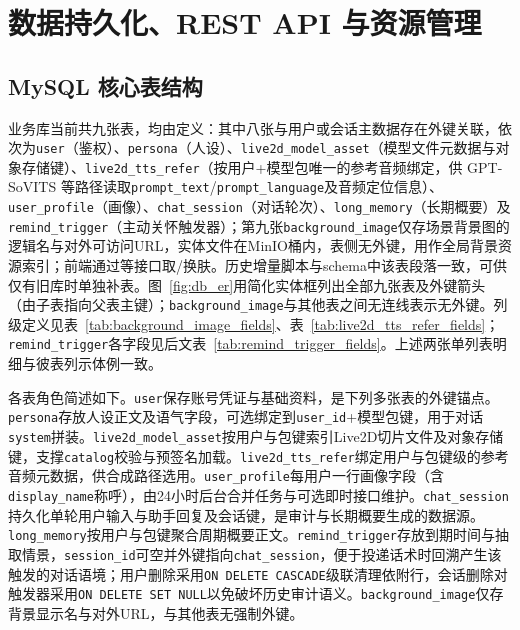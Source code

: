 \documentclass{base}
\begin{document}
\section{数据持久化、REST API 与资源管理}

\subsection{MySQL 核心表结构}

\begin{sloppypar}
    业务库当前共九张表，均由定义：其中八张与用户或会话主数据存在外键关联，依次为\texttt{user}（鉴权）、\texttt{persona}（人设）、\texttt{live2d\_model\_asset}（模型文件元数据与对象存储键）、\texttt{live2d\_tts\_refer}（按用户+模型包唯一的参考音频绑定，供 GPT-SoVITS 等路径读取\texttt{prompt\_text}/\texttt{prompt\_language}及音频定位信息）、\texttt{user\_profile}（画像）、\texttt{chat\_session}（对话轮次）、\texttt{long\_memory}（长期概要）及\texttt{remind\_trigger}（主动关怀触发器）；第九张\texttt{background\_image}仅存场景背景图的逻辑名与对外可访问URL，实体文件在MinIO桶内，表侧无外键，用作全局背景资源索引；前端通过等接口取/换肤。历史增量脚本与schema中该表段落一致，可供仅有旧库时单独补表。图~\ref{fig:db_er}用简化实体框列出全部九张表及外键箭头（由子表指向父表主键）；\texttt{background\_image}与其他表之间无连线表示无外键。列级定义见表~\ref{tab:background_image_fields}、表~\ref{tab:live2d_tts_refer_fields}；\texttt{remind\_trigger}各字段见后文表~\ref{tab:remind_trigger_fields}。上述两张单列表明细与彼表列示体例一致。
\end{sloppypar}

\begin{sloppypar}
    各表角色简述如下。\texttt{user}保存账号凭证与基础资料，是下列多张表的外键锚点。\texttt{persona}存放人设正文及语气字段，可选绑定到\texttt{user\_id}+模型包键，用于对话\texttt{system}拼装。\texttt{live2d\_model\_asset}按用户与包键索引Live2D切片文件及对象存储键，支撑\texttt{catalog}校验与预签名加载。\texttt{live2d\_tts\_refer}绑定用户与包键级的参考音频元数据，供合成路径选用。\texttt{user\_profile}每用户一行画像字段（含\texttt{display\_name}称呼），由24小时后台合并任务与可选即时接口维护。\texttt{chat\_session}持久化单轮用户输入与助手回复及会话键，是审计与长期概要生成的数据源。\texttt{long\_memory}按用户与包键聚合周期概要正文。\texttt{remind\_trigger}存放到期时间与抽取情景，\texttt{session\_id}可空并外键指向\texttt{chat\_session}，便于投递话术时回溯产生该触发的对话语境；用户删除采用\texttt{ON DELETE CASCADE}级联清理依附行，会话删除对触发器采用\texttt{ON DELETE SET NULL}以免破坏历史审计语义。\texttt{background\_image}仅存背景显示名与对外URL，与其他表无强制外键。
\end{sloppypar}
\end{document}
